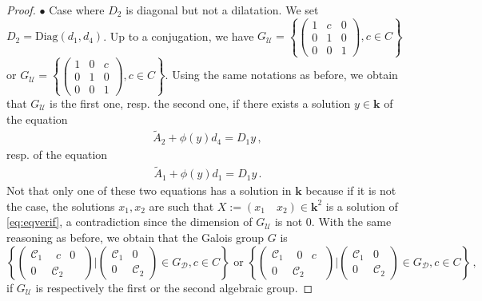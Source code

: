 \documentclass[a4paper,11pt]{amsart}
\newcommand{\Gdiag}{G_{\mathcal{D}}}
\newcommand{\Gunip}{G_{\mathcal{U}}}
\def\k{\mathbf{k}}
\begin{document}
\begin{proof}
$\bullet$ Case where $D_2$ is diagonal but not a dilatation.  We set $D_2 = \mathrm{Diag}(d_1,d_4)$. Up to a conjugation, we have $\Gunip=\left\{ \begin{pmatrix}
1& c&0 \\ 
0 & 1 &0 \\
0&0&1
\end{pmatrix}, c\in C \right\}$ or  $\Gunip=\left\{ \begin{pmatrix}
1& 0&c \\ 
0 & 1 &0 \\
0&0&1
\end{pmatrix}, c\in C \right\}$. 
Using the same notations as before, we obtain that $\Gunip$ is the first one, resp. the second one, if there exists a solution $y\in \k$ of the equation
\begin{align}
    \label{eqaverifier}
    \widetilde{A}_2 + \phi(y)d_4 = D_1y \, ,
\end{align}
resp. of the equation
\begin{align}
    \label{eqaverifierbis}
   \widetilde{A}_1 + \phi(y)d_1 = D_1y  \, .
\end{align}
Not that only one of these two equations has a solution in $\k$ because if it is not the case, the solutions $x_1, x_2$ are such that $X:=(x_1\quad x_2)\in\k^2$ is a solution of \eqref{eq:eqverif}, a contradiction since the dimension of $\Gunip$ is not $0$.
With the same reasoning as before, we obtain that the Galois group $G$ is 
$$\left\{ \begin{pmatrix}
\mathscr{C}_1& \begin{matrix} c & 0 \end{matrix} \\ 
0 & \mathscr{C}_2
\end{pmatrix}\Bigg|   \begin{pmatrix}
\mathscr{C}_1& 0 \\ 
0 & \mathscr{C}_2
\end{pmatrix} \in \Gdiag,   c\in C \right\} \text{ or } \left\{ \begin{pmatrix}
\mathscr{C}_1& \begin{matrix} 0&c \end{matrix} \\ 
0 & \mathscr{C}_2
\end{pmatrix}\Bigg|   \begin{pmatrix}
\mathscr{C}_1& 0 \\ 
0 & \mathscr{C}_2
\end{pmatrix} \in \Gdiag,   c\in C \right\}\, ,
$$
if $\Gunip$ is respectively the first or the second algebraic group. 



\end{proof}
\end{document}

